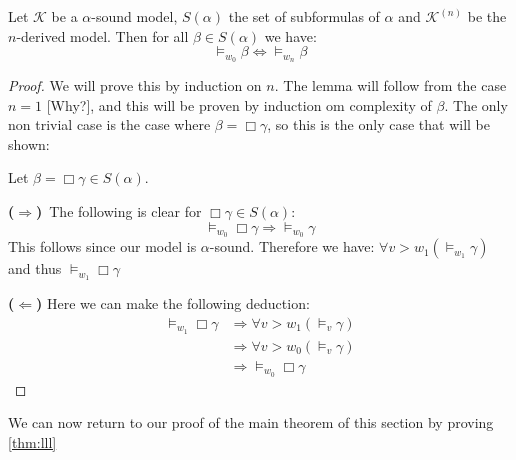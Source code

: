 \documentclass[../main.tex]{subfiles}
\begin{document}
\begin{lem}
	\label{lem:GLS}
	Let $\mathcal{K}$ be a $\alpha$-sound model, $S(\alpha)$ the set of
	subformulas of $\alpha$ and $\mathcal{K}^{(n)}$ be the $n$-derived
	model. Then for all $\beta\in S(\alpha)$ we have:
	$$\vDash_{w_0}\beta\Leftrightarrow\vDash_{w_n}\beta$$
\end{lem}
\begin{proof}
	We will prove this by induction on $n$. The lemma will follow from the
	case $n=1$ [Why?], and this will be proven by induction om complexity
	of $\beta$. The only non trivial case is the case where
	$\beta=\Box\gamma$, so this is the only case that will be shown:

	Let $\beta=\Box\gamma\in S(\alpha)$. 

	\textbf{($\Rightarrow$)}\ The following is clear for
	$\Box\gamma\in S(\alpha)$:
	$$\vDash_{w_0}\Box\gamma\Rightarrow\vDash_{w_0}\gamma$$
	This follows since our model is $\alpha$-sound. Therefore we have:
	$\forall v>w_1(\vDash_{w_1}\gamma)$ and thus $\vDash_{w_1}\Box\gamma$

	\textbf{($\Leftarrow$)} Here we can make the following deduction:
	\begin{align*}
		\vDash_{w_1}\Box\gamma&\Rightarrow\forall
		v>w_1(\vDash_v\gamma)\\
				      &\Rightarrow\forall
				      v>w_0(\vDash_v\gamma)\\
				      &\Rightarrow\vDash_{w_0}\Box\gamma
	\end{align*}
\end{proof}
We can now return to our proof of the main theorem of this section by proving
\ref{thm:lll}
\end{document}
